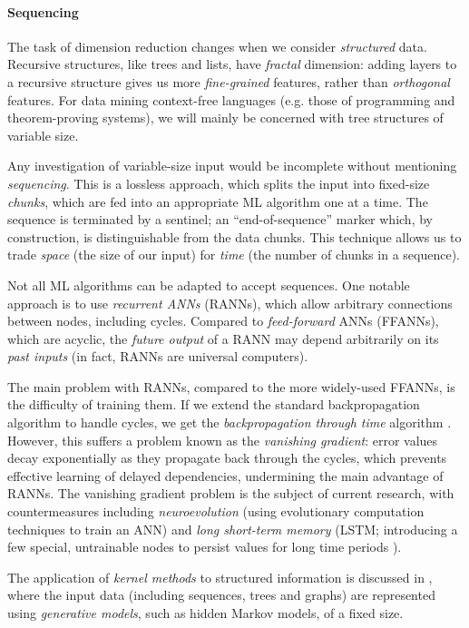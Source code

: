 \documentclass[]{article}
\begin{document}
\paragraph{Sequencing}

The task of dimension reduction changes when we consider \emph{structured} data. Recursive structures, like trees and lists, have \emph{fractal} dimension: adding layers to a recursive structure gives us more \emph{fine-grained} features, rather than \emph{orthogonal} features. For data mining context-free languages (e.g. those of programming and theorem-proving systems), we will mainly be concerned with tree structures of variable size.

Any investigation of variable-size input would be incomplete without mentioning \emph{sequencing}. This is a lossless approach, which splits the input into fixed-size \emph{chunks}, which are fed into an appropriate ML algorithm one at a time. The sequence is terminated by a sentinel; an ``end-of-sequence'' marker which, by construction, is distinguishable from the data chunks. This technique allows us to trade \emph{space} (the size of our input) for \emph{time} (the number of chunks in a sequence).

Not all ML algorithms can be adapted to accept sequences. One notable approach is to use \emph{recurrent ANNs} (RANNs), which allow arbitrary connections between nodes, including cycles. Compared to \emph{feed-forward} ANNs (FFANNs), which are acyclic, the \emph{future output} of a RANN may depend arbitrarily on its \emph{past inputs} (in fact, RANNs are universal computers).

The main problem with RANNs, compared to the more widely-used FFANNs, is the difficulty of training them. If we extend the standard backpropagation algorithm to handle cycles, we get the \emph{backpropagation through time} algorithm \cite{werbos1990backpropagation}. However, this suffers a problem known as the \emph{vanishing gradient}: error values decay exponentially as they propagate back through the cycles, which prevents effective learning of delayed dependencies, undermining the main advantage of RANNs. The vanishing gradient problem is the subject of current research, with countermeasures including \emph{neuroevolution} (using evolutionary computation techniques to train an ANN) and \emph{long short-term memory} (LSTM; introducing a few special, untrainable nodes to persist values for long time periods \cite{hochreiter1997long}).

The application of \emph{kernel methods} to structured information is discussed in \cite{Gartner2003}, where the input data (including sequences, trees and graphs) are represented using \emph{generative models}, such as hidden Markov models, of a fixed size.
\end{document}

